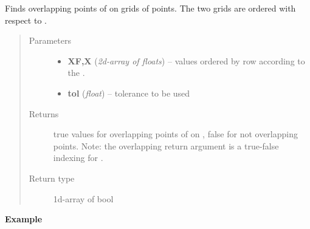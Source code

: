 \documentclass[letterpaper,10pt,english]{sphinxmanual}
\begin{document}

\begin{fulllineitems}
\label{index:SpectralToolbox.Misc.findOverlapping}
Finds overlapping points of  on  grids of points. The two grids are ordered with respect to .
\begin{quote}\begin{description}
\item[{Parameters}] \leavevmode\begin{itemize}
\item {} 
\textbf{XF,X} (\emph{2d-array of floats}) -- values ordered by row according to the .

\item {} 
\textbf{tol} (\emph{float}) -- tolerance to be used

\end{itemize}

\item[{Returns}] \leavevmode
true values for overlapping points of  on , false for not overlapping points. Note: the overlapping return argument is a true-false indexing for .

\item[{Return type}] \leavevmode
1d-array of bool

\end{description}\end{quote}

\textbf{Example}


\end{fulllineitems}
\end{document}
